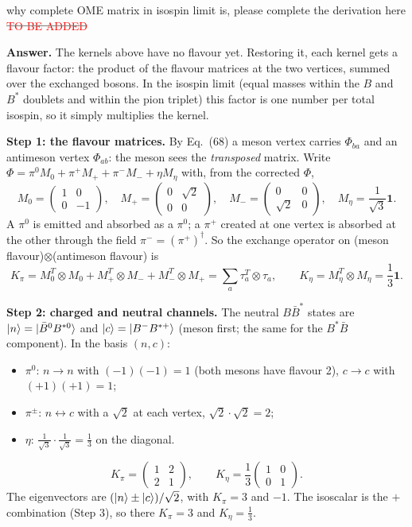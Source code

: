 \documentclass[11pt]{article}
\newcommand{\todo}{\textcolor{red}{TO BE ADDED}}
\newcommand{\aifix}[2]{\textcolor{gray}{\sout{#1}} \textcolor{aicolor}{#2}}
\newcommand{\aifix}[2]{#2}
\newenvironment{aiadd}{\par}{\par}
\begin{document}
why complete OME matrix in isospin limit is, please complete the derivation here \aifix{\todo}{}

\begin{aiadd}
	\textbf{Answer.} The kernels above have no flavour yet. Restoring it, each kernel gets a flavour factor: the product of the flavour matrices at the two vertices, summed over the exchanged bosons. In the isospin limit (equal masses within the $B$ and $B^*$ doublets and within the pion triplet) this factor is one number per total isospin, so it simply multiplies the kernel.

	\textbf{Step 1: the flavour matrices.} By Eq.~(68) a meson vertex carries $\Phi_{ba}$ and an antimeson vertex $\Phi_{ab}$: the meson sees the \emph{transposed} matrix. Write $\Phi=\pi^0M_0+\pi^+M_++\pi^-M_-+\eta M_\eta$ with, from the corrected $\Phi$,
	\[
		M_0=\begin{pmatrix}1&0\\0&-1\end{pmatrix},\quad
		M_+=\begin{pmatrix}0&\sqrt2\\0&0\end{pmatrix},\quad
		M_-=\begin{pmatrix}0&0\\ \sqrt2&0\end{pmatrix},\quad
		M_\eta=\frac{1}{\sqrt3}\bm 1 .
	\]
	A $\pi^0$ is emitted and absorbed as a $\pi^0$; a $\pi^+$ created at one vertex is absorbed at the other through the field $\pi^-=(\pi^+)^\dagger$. So the exchange operator on (meson flavour)$\otimes$(antimeson flavour) is
	\[
		K_\pi=M_0^T\otimes M_0+M_+^T\otimes M_-+M_-^T\otimes M_+=\sum_a\tau_a^T\otimes\tau_a,\qquad
		K_\eta=M_\eta^T\otimes M_\eta=\frac13\bm 1 .
	\]

	\textbf{Step 2: charged and neutral channels.} The neutral $B\bar B^*$ states are $\ket n=\ket{\bar B^0B^{*0}}$ and $\ket c=\ket{B^-B^{*+}}$ (meson first; the same for the $B^*\bar B$ component). In the basis $(n,c)$:
	\begin{itemize}
		\item $\pi^0$: $n\to n$ with $(-1)(-1)=1$ (both mesons have flavour 2), $c\to c$ with $(+1)(+1)=1$;
		\item $\pi^\pm$: $n\leftrightarrow c$ with a $\sqrt2$ at each vertex, $\sqrt2\cdot\sqrt2=2$;
		\item $\eta$: $\frac{1}{\sqrt3}\cdot\frac{1}{\sqrt3}=\frac13$ on the diagonal.
	\end{itemize}
	\[
		K_\pi=\begin{pmatrix}1&2\\2&1\end{pmatrix},\qquad K_\eta=\frac13\begin{pmatrix}1&0\\0&1\end{pmatrix}.
	\]
	The eigenvectors are $(\ket n\pm\ket c)/\sqrt2$, with $K_\pi=3$ and $-1$. The isoscalar is the $+$ combination (Step 3), so there $K_\pi=3$ and $K_\eta=\frac13$.


\end{aiadd}
\end{document}
